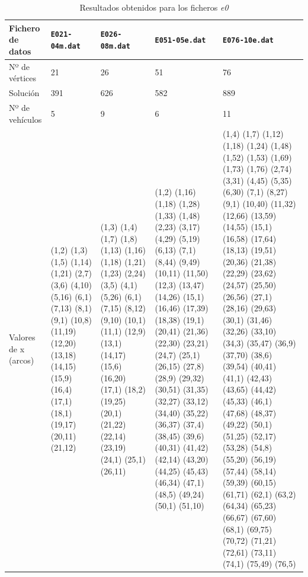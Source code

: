\documentclass[a4paper,11pt]{article}
\begin{document}
\begin{table}[!htbp]
\label{results_e0}
\centering
\begin{tabularx}{\textwidth}{|X|X|X|X|X|}
\hline
Fichero de datos	& \texttt{E021-04m.dat}	& \texttt{E026-08m.dat}	& \texttt{E051-05e.dat}	& \texttt{E076-10e.dat}	\\ \hline
Nº de vértices	& 21	& 26	& 51	& 76	\\ \hline
Solución	& 391	& 626	& 582	& 889	\\ \hline
Nº de vehículos	& 5	& 9	& 6	& 11	\\ \hline
Valores de x (arcos)	& (1,2) (1,3) (1,5) (1,14) (1,21) (2,7) (3,6) (4,10) (5,16) (6,1) (7,13) (8,1) (9,1) (10,8) (11,19) (12,20) (13,18) (14,15) (15,9) (16,4) (17,1) (18,1) (19,17) (20,11) (21,12)	& (1,3) (1,4) (1,7) (1,8) (1,13) (1,16) (1,18) (1,21) (1,23) (2,24) (3,5) (4,1) (5,26) (6,1) (7,15) (8,12) (9,10) (10,1) (11,1) (12,9) (13,1) (14,17) (15,6) (16,20) (17,1) (18,2) (19,25) (20,1) (21,22) (22,14) (23,19) (24,1) (25,1) (26,11)	& (1,2) (1,16) (1,18) (1,28) (1,33) (1,48) (2,23) (3,17) (4,29) (5,19) (6,13) (7,1) (8,44) (9,49) (10,11) (11,50) (12,3) (13,47) (14,26) (15,1) (16,46) (17,39) (18,38) (19,1) (20,41) (21,36) (22,30) (23,21) (24,7) (25,1) (26,15) (27,8) (28,9) (29,32) (30,51) (31,35) (32,27) (33,12) (34,40) (35,22) (36,37) (37,4) (38,45) (39,6) (40,31) (41,42) (42,14) (43,20) (44,25) (45,43) (46,34) (47,1) (48,5) (49,24) (50,1) (51,10)	& (1,4) (1,7) (1,12) (1,18) (1,24) (1,48) (1,52) (1,53) (1,69) (1,73) (1,76) (2,74) (3,31) (4,45) (5,35) (6,30) (7,1) (8,27) (9,1) (10,40) (11,32) (12,66) (13,59) (14,55) (15,1) (16,58) (17,64) (18,13) (19,51) (20,36) (21,38) (22,29) (23,62) (24,57) (25,50) (26,56) (27,1) (28,16) (29,63) (30,1) (31,46) (32,26) (33,10) (34,3) (35,47) (36,9) (37,70) (38,6) (39,54) (40,41) (41,1) (42,43) (43,65) (44,42) (45,33) (46,1) (47,68) (48,37) (49,22) (50,1) (51,25) (52,17) (53,28) (54,8) (55,20) (56,19) (57,44) (58,14) (59,39) (60,15) (61,71) (62,1) (63,2) (64,34) (65,23) (66,67) (67,60) (68,1) (69,75) (70,72) (71,21) (72,61) (73,11) (74,1) (75,49) (76,5)	\\ \hline
\end{tabularx}
\caption{Resultados obtenidos para los ficheros \textit{e0}}
\end{table}
\end{document}
